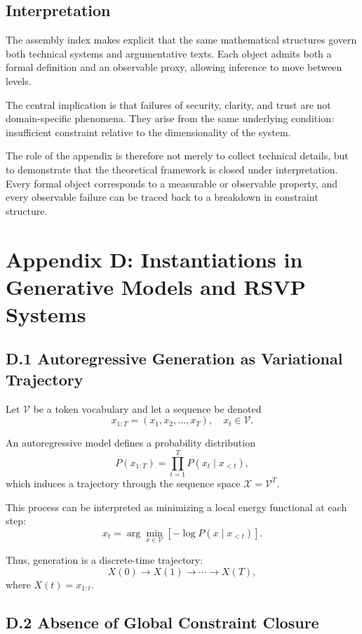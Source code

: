 \documentclass[12pt, oneside]{article}
\theoremstyle{plain}
\theoremstyle{definition}
\theoremstyle{remark}
\begin{document}
\subsection{Interpretation}

The assembly index makes explicit that the same mathematical structures govern both
technical systems and argumentative texts. Each object admits both a formal definition
and an observable proxy, allowing inference to move between levels.

The central implication is that failures of security, clarity, and trust are not
domain-specific phenomena. They arise from the same underlying condition: insufficient
constraint relative to the dimensionality of the system.

The role of the appendix is therefore not merely to collect technical details, but to
demonstrate that the theoretical framework is closed under interpretation. Every formal
object corresponds to a measurable or observable property, and every observable failure
can be traced back to a breakdown in constraint structure.

\appendix

\section{Appendix D: Instantiations in Generative Models and RSVP Systems}

\subsection{D.1 Autoregressive Generation as Variational Trajectory}

Let $\mathcal{V}$ be a token vocabulary and let a sequence be denoted
\[
x_{1:T} = (x_1, x_2, \dots, x_T), \quad x_t \in \mathcal{V}.
\]

An autoregressive model defines a probability distribution
\[
P(x_{1:T}) = \prod_{t=1}^T P(x_t \mid x_{<t}),
\]
which induces a trajectory through the sequence space $\mathcal{X} = \mathcal{V}^T$.

This process can be interpreted as minimizing a local energy functional at each step:
\[
x_t = \arg\min_{x \in \mathcal{V}} \left[ -\log P(x \mid x_{<t}) \right].
\]

Thus, generation is a discrete-time trajectory:
\[
X(0) \to X(1) \to \cdots \to X(T),
\]
where $X(t) = x_{1:t}$.

\subsection{D.2 Absence of Global Constraint Closure}
\end{document}
